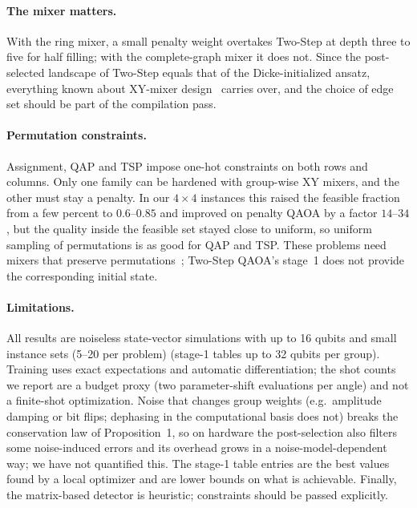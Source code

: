 \paragraph{The mixer matters.}
With the ring mixer, a small penalty weight overtakes Two-Step at depth three to five for half filling; with the complete-graph mixer it does not. Since the post-selected landscape of Two-Step equals that of the Dicke-initialized ansatz, everything known about XY-mixer design~\cite{wang2020xy} carries over, and the choice of edge set should be part of the compilation pass.

\paragraph{Permutation constraints.}
Assignment, QAP and TSP impose one-hot constraints on both rows and columns. Only one family can be hardened with
group-wise XY mixers, and the other must stay a penalty. In our $4\times4$ instances this raised the feasible fraction
from a few percent to $0.6$--$0.85$ and improved on penalty QAOA by a factor $14$--$34$, but the quality inside the feasible set
stayed close to uniform, so uniform sampling of permutations is as good for QAP and TSP. These problems need mixers that
preserve permutations~\cite{Hadfield_2019}; Two-Step QAOA's stage~1 does not provide the corresponding initial state.

\paragraph{Limitations.}
All results are noiseless state-vector simulations with up to 16 qubits and small instance sets (5--20 per problem) (stage-1 tables up to 32 qubits per group).
Training uses exact expectations and automatic differentiation; the shot counts we report are a budget proxy
(two parameter-shift evaluations per angle) and not a finite-shot optimization. Noise that changes group weights (e.g.\ amplitude damping or bit flips; dephasing in the computational basis does not) breaks the conservation law of
Proposition~1, so on hardware the post-selection also filters some noise-induced errors and its overhead grows in a noise-model-dependent way; we have
not quantified this. The stage-1 table entries are the best values found by a local optimizer and are lower bounds on what
is achievable. Finally, the matrix-based detector is heuristic; constraints should be passed explicitly.
